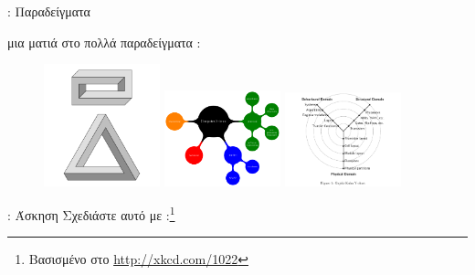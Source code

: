 \documentclass{beamer}
\begin{document}
\begin{frame}[fragile]{\insertsection: Παραδείγματα}
\begin{itemize}
 μια ματιά στο \en {} \gr {} πολλά παραδείγματα \en \tikzname{}:
\end{itemize}
\begin{figure}
\href{http://texample.net/tikz/examples/escher-brick-penrose-triangle/}{%
  \includegraphics[width=0.3\textwidth]{escher-brick-penrose-triangle}}
\href{http://texample.net/tikz/examples/computer-science-mindmap/}{%
  \includegraphics[width=0.3\textwidth]{computer-science-mindmap}}
\href{http://texample.net/tikz/examples/gajski-kuhn-y-chart/}{%
  \includegraphics[width=0.3\textwidth]{gajski-kuhn-y-chart}}
\end{figure}
\end{frame}

\begin{frame}[fragile]{\insertsection: Άσκηση}
Σχεδιάστε αυτό με \en \tikzname:\footnote{\gr Βασισμένο στο \en  \url{http://xkcd.com/1022}}
\begin{figure}

\end{figure}
\end{frame}
\end{document}
